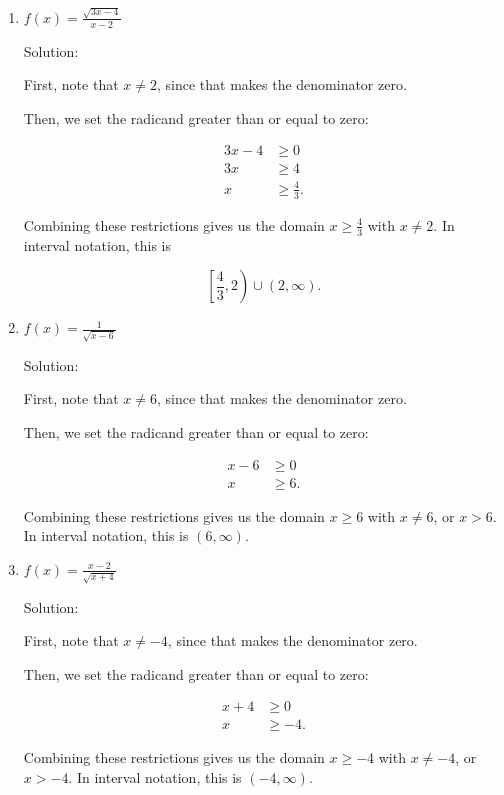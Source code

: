 \documentclass{ximera}
\begin{document}
\begin{enumerate}
	\item $f(x) = \frac{\sqrt{3x - 4}}{x - 2}$
		\begin{expandable}
			Solution:

First, note that $x \ne 2$, since that makes the denominator zero.

Then, we set the radicand greater than or equal to zero:

\begin{align*}3x-4&\ge 0 \\ 3x & \ge 4 \\ x & \ge \frac{4}{3}. \end{align*}

Combining these restrictions gives us the domain $x \ge \frac{4}{3}$ with $x \ne 2$. In interval notation, this is

$$\left[\frac{4}{3}, 2\right) \cup (2, \infty).$$
		\end{expandable}
	\item $f(x) = \frac{1}{\sqrt{x - 6}}$
		\begin{expandable}
			Solution:

First, note that $x \ne 6$, since that makes the denominator zero.

Then, we set the radicand greater than or equal to zero:

\begin{align*}x-6&\ge 0 \\ x & \ge 6. \end{align*}

Combining these restrictions gives us the domain $x \ge 6$ with $x \ne 6$, or $x > 6$. In interval notation, this is $(6, \infty)$.
		\end{expandable}
	\item $f(x) = \frac{x - 2}{\sqrt{x + 4}}$
		\begin{expandable}
			Solution:

First, note that $x \ne -4$, since that makes the denominator zero.

Then, we set the radicand greater than or equal to zero:

\begin{align*}x + 4&\ge 0 \\ x & \ge -4. \end{align*}

Combining these restrictions gives us the domain $x \ge -4$ with $x \ne -4$, or $x > -4$. In interval notation, this is $(-4, \infty)$.


\end{expandable}
\end{enumerate}
\end{document}
